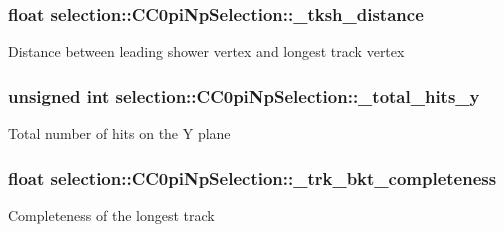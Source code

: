 \subsubsection[{\texorpdfstring{\+\_\+tksh\+\_\+distance}{_tksh_distance}}]{\setlength{\rightskip}{0pt plus 5cm}float selection\+::\+C\+C0pi\+Np\+Selection\+::\+\_\+tksh\+\_\+distance\hspace{0.3cm}{\ttfamily [private]}}\hypertarget{classselection_1_1CC0piNpSelection_a73d772bb569336b56a3f14cee752e2f3}{}\label{classselection_1_1CC0piNpSelection_a73d772bb569336b56a3f14cee752e2f3}
Distance between leading shower vertex and longest track vertex 
\subsubsection[{\texorpdfstring{\+\_\+total\+\_\+hits\+\_\+y}{_total_hits_y}}]{\setlength{\rightskip}{0pt plus 5cm}unsigned int selection\+::\+C\+C0pi\+Np\+Selection\+::\+\_\+total\+\_\+hits\+\_\+y\hspace{0.3cm}{\ttfamily [private]}}\hypertarget{classselection_1_1CC0piNpSelection_a819d1d973e74bcd2ad82aa01ea24ac37}{}\label{classselection_1_1CC0piNpSelection_a819d1d973e74bcd2ad82aa01ea24ac37}
Total number of hits on the Y plane 
\subsubsection[{\texorpdfstring{\+\_\+trk\+\_\+bkt\+\_\+completeness}{_trk_bkt_completeness}}]{\setlength{\rightskip}{0pt plus 5cm}float selection\+::\+C\+C0pi\+Np\+Selection\+::\+\_\+trk\+\_\+bkt\+\_\+completeness\hspace{0.3cm}{\ttfamily [private]}}\hypertarget{classselection_1_1CC0piNpSelection_aab22ce289e2d4a109440369e30fddf52}{}\label{classselection_1_1CC0piNpSelection_aab22ce289e2d4a109440369e30fddf52}
Completeness of the longest track 
